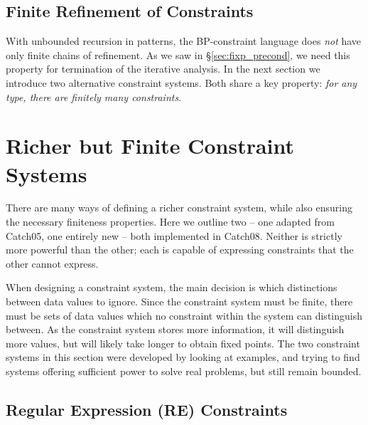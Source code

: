 \documentclass[preprint]{sigplanconf}
\begin{document}
\subsection{Finite Refinement of Constraints}
\label{sec:bounded}

With unbounded recursion in patterns, the BP-constraint language does \textit{not} have only finite chains of refinement. As we saw in \S\ref{sec:fixp_precond}, we need this property for termination of the iterative analysis. In the next section we introduce two alternative constraint systems. Both share a key property: \textit{for any type, there are finitely many constraints}.


\section{Richer but Finite Constraint Systems}
\label{sec:constraint}

There are many ways of defining a richer constraint system, while also ensuring the necessary finiteness properties. Here we outline two -- one adapted from Catch05, one entirely new -- both implemented in Catch08. Neither is strictly more powerful than the other; each is capable of expressing constraints that the other cannot express.

When designing a constraint system, the main decision is which distinctions between data values to ignore. Since the constraint system must be finite, there must be sets of data values which no constraint within the system can distinguish between. As the constraint system stores more information, it will distinguish more values, but will likely take longer to obtain fixed points. The two constraint systems in this section were developed by looking at examples, and trying to find systems offering sufficient power to solve real problems, but still remain bounded.

\subsection{Regular Expression (RE) Constraints}
\label{sec:regexp}
\end{document}

